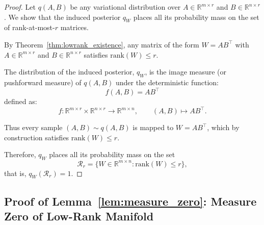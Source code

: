 \documentclass{article}
\theoremstyle{plain}
\theoremstyle{definition}
\theoremstyle{remark}
\begin{document}
\begin{proof}
Let $q(A,B)$ be any variational distribution over $A \in \mathbb{R}^{m \times r}$ and $B \in \mathbb{R}^{n \times r}$. We show that the induced posterior $q_W$ places all its probability mass on the set of rank-at-most-$r$ matrices.

By Theorem~\ref{thm:lowrank_existence}, any matrix of the form $W = AB^\top$ with $A \in \mathbb{R}^{m \times r}$ and $B \in \mathbb{R}^{n \times r}$ satisfies $\mathrm{rank}(W) \leq r$.

The distribution of the induced posterior, $q_W$, is the image measure (or pushforward measure) of $q(A,B)$ under the deterministic function:
\[
f(A,B) = A B^\top
\]
defined as:
\[
f : \mathbb{R}^{m \times r} \times \mathbb{R}^{n \times r} \longrightarrow \mathbb{R}^{m \times n}, \qquad
(A, B) \longmapsto A B^\top.
\]

Thus every sample $(A, B) \sim q(A,B)$ is mapped to $W = AB^\top$, which by construction satisfies $\mathrm{rank}(W) \leq r$.

Therefore, $q_W$ places all its probability mass on the set 
\[
\mathcal{R}_r = \{W \in \mathbb{R}^{m \times n} : \mathrm{rank}(W) \leq r\},
\]
that is, $q_W(\mathcal{R}_r) = 1$.
\end{proof}



\subsection{Proof of Lemma~\ref{lem:measure_zero}: Measure Zero of Low-Rank Manifold}\label{app:measure_zero}
\end{document}
